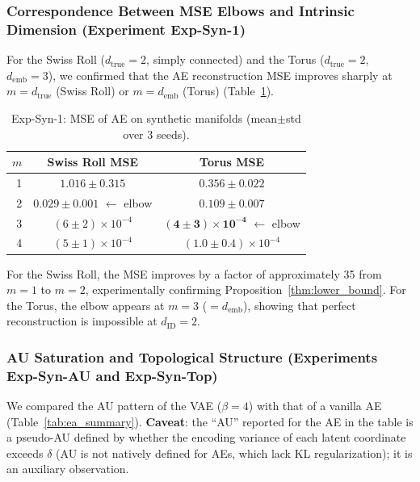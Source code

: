\documentclass[make,article,submit,pdftex,moreauthors]{Definitions/mdpi}
\newcommand{\dID}{d_{\mathrm{ID}}}
\newcommand{\dtrue}{d_{\mathrm{true}}}
\newcommand{\demb}{d_{\mathrm{emb}}}
\begin{document}
\subsubsection{Correspondence Between MSE Elbows and Intrinsic Dimension (Experiment Exp-Syn-1)}

For the Swiss Roll ($\dtrue = 2$, simply connected) and the Torus ($\dtrue = 2$, $\demb = 3$),
we confirmed that the AE reconstruction MSE improves sharply at $m = \dtrue$ (Swiss Roll) or $m = \demb$ (Torus)
(Table~\ref{tab:e1}).

\begin{table}[H]
\centering
\caption{Exp-Syn-1: MSE of AE on synthetic manifolds (mean$\pm$std over 3 seeds).}
\label{tab:e1}
\small
\begin{tabular}{rcc}
\toprule
$m$ & Swiss Roll MSE & Torus MSE \\
\midrule
1 & $1.016\pm0.315$ & $0.356\pm0.022$ \\
2 & $\boldsymbol{0.029\pm0.001}$ $\leftarrow$ elbow & $0.109\pm0.007$ \\
3 & $(6\pm2)\times10^{-4}$ & $\boldsymbol{(4\pm3)\times10^{-4}}$ $\leftarrow$ elbow \\
4 & $(5\pm1)\times10^{-4}$ & $(1.0\pm0.4)\times10^{-4}$ \\
\bottomrule
\end{tabular}
\end{table}

For the Swiss Roll, the MSE improves by a factor of approximately 35 from $m = 1$ to $m = 2$,
experimentally confirming Proposition~\ref{thm:lower_bound}.
For the Torus, the elbow appears at $m = 3$ ($= \demb$),
showing that perfect reconstruction is impossible at $\dID = 2$.

\subsubsection{AU Saturation and Topological Structure (Experiments Exp-Syn-AU and Exp-Syn-Top)}

We compared the AU pattern of the VAE ($\beta = 4$) with that of a vanilla AE (Table~\ref{tab:ea_summary}).
\textbf{Caveat}: the ``AU'' reported for the AE in the table is a pseudo-AU defined by
whether the encoding variance of each latent coordinate exceeds $\delta$
(AU is not natively defined for AEs, which lack KL regularization); it is an
auxiliary observation.
\end{document}
